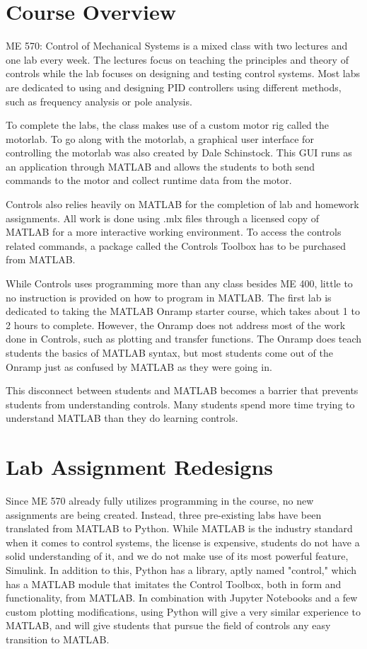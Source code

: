 \section{Course Overview}

ME 570: Control of Mechanical Systems is a mixed class with two lectures and one lab every week. The lectures focus on teaching
the principles and theory of controls while the lab focuses on designing and testing control systems. Most labs are dedicated to
using and designing PID controllers using different methods, such as frequency analysis or pole analysis.

To complete the labs, the class makes use of a custom motor rig called the motorlab. To go along with the motorlab, a graphical 
user interface for controlling the motorlab was also created by Dale Schinstock. This GUI runs as an application through MATLAB 
and allows the students to both send commands to the motor and collect runtime data from the motor.

Controls also relies heavily on MATLAB for the completion of lab and homework assignments. All work is done using .mlx files through a 
licensed copy of MATLAB for a more interactive working environment. To access the controls related commands, a package called 
the Controls Toolbox has to be purchased from MATLAB. 

While Controls uses programming more than any class besides ME 400, little to no instruction is provided on how to program in MATLAB.
The first lab is dedicated to taking the MATLAB Onramp starter course, which takes about 1 to 2 hours to complete. However, the 
Onramp does not address most of the work done in Controls, such as plotting and transfer functions. The Onramp does teach students
the basics of MATLAB syntax, but most students come out of the Onramp just as confused by MATLAB as they were going in.

This disconnect between students and MATLAB becomes a barrier that prevents students from understanding controls. Many students
spend more time trying to understand MATLAB than they do learning controls. 

\section{Lab Assignment Redesigns}

Since ME 570 already fully utilizes programming in the course, no new assignments are being created. Instead, three pre-existing
labs have been translated from MATLAB to Python. While MATLAB is the industry standard when it comes to control systems, the
license is expensive, students do not have a solid understanding of it, and we do not make use of its most powerful feature,
Simulink. In addition to this, Python has a library, aptly named "control," which has a MATLAB module that imitates the Control
Toolbox, both in form and functionality, from MATLAB. In combination with Jupyter Notebooks and a few custom plotting modifications,
using Python will give a very similar experience to MATLAB, and will give students that pursue the field of controls any easy
transition to MATLAB. 

